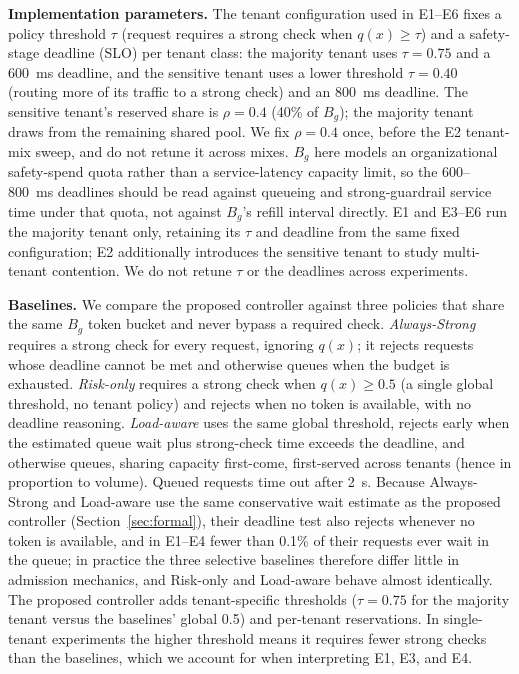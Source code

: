 \documentclass[conference]{IEEEtran}
\newcommand{\Bg}{B_g}
\begin{document}
\textbf{Implementation parameters.} The tenant configuration used in E1--E6 fixes a policy threshold $\tau$ (request requires a strong check when $q(x) \ge \tau$) and a safety-stage deadline (SLO) per tenant class: the majority tenant uses $\tau{=}0.75$ and a 600~ms deadline, and the sensitive tenant uses a lower threshold $\tau{=}0.40$ (routing more of its traffic to a strong check) and an 800~ms deadline. The sensitive tenant's reserved share is $\rho{=}0.4$ (40\% of $\Bg$); the majority tenant draws from the remaining shared pool. We fix $\rho = 0.4$ once, before the E2 tenant-mix sweep, and do not retune it across mixes. $\Bg$ here models an organizational safety-spend quota rather than a service-latency capacity limit, so the 600--800~ms deadlines should be read against queueing and strong-guardrail service time under that quota, not against $\Bg$'s refill interval directly. E1 and E3--E6 run the majority tenant only, retaining its $\tau$ and deadline from the same fixed configuration; E2 additionally introduces the sensitive tenant to study multi-tenant contention. We do not retune $\tau$ or the deadlines across experiments.

\textbf{Baselines.} We compare the proposed controller against three policies that share the same $\Bg$ token bucket and never bypass a required check. \emph{Always-Strong} requires a strong check for every request, ignoring $q(x)$; it rejects requests whose deadline cannot be met and otherwise queues when the budget is exhausted. \emph{Risk-only} requires a strong check when $q(x) \ge 0.5$ (a single global threshold, no tenant policy) and rejects when no token is available, with no deadline reasoning. \emph{Load-aware} uses the same global threshold, rejects early when the estimated queue wait plus strong-check time exceeds the deadline, and otherwise queues, sharing capacity first-come, first-served across tenants (hence in proportion to volume). Queued requests time out after 2~s. Because Always-Strong and Load-aware use the same conservative wait estimate as the proposed controller (Section~\ref{sec:formal}), their deadline test also rejects whenever no token is available, and in E1--E4 fewer than 0.1\% of their requests ever wait in the queue; in practice the three selective baselines therefore differ little in admission mechanics, and Risk-only and Load-aware behave almost identically. The proposed controller adds tenant-specific thresholds ($\tau{=}0.75$ for the majority tenant versus the baselines' global 0.5) and per-tenant reservations. In single-tenant experiments the higher threshold means it requires fewer strong checks than the baselines, which we account for when interpreting E1, E3, and E4.
\end{document}
